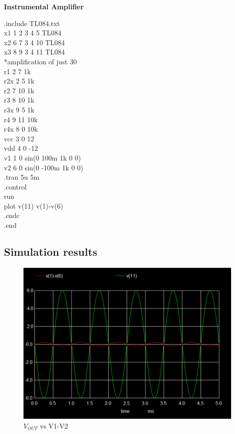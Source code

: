 \documentclass[12pt]{article}
\begin{document}
\begin{center}
\textbf{Instrumental Amplifier}
\end{center}
.include TL084.txt\\
x1 1 2 3 4 5 TL084\\
x2 6 7 3 4 10 TL084\\
x3 8 9 3 4 11 TL084\\
*amplification of just 30\\
r1 2 7 1k\\
r2x 2 5 1k\\
r2 7 10 1k\\
r3 8 10 1k\\
r3x 9 5 1k\\
r4 9 11 10k\\
r4x 8 0 10k\\
vcc 3 0 12\\
vdd 4 0 -12\\
v1 1 0 sin(0 100m 1k 0 0)\\ 
v2 6 0 sin(0 -100m 1k 0 0) \\
.tran 5u 5m\\
.control\\
run\\
plot v(11) v(1)-v(6)\\
.endc\\
.end\\

\subsection{Simulation results}


\begin{figure}[H]
\begin{center}
\includegraphics[scale = 0.6]{b.png}
\caption{$V_{OUT}$ vs V1-V2}
\end{center}
\end{figure}
\end{document}
